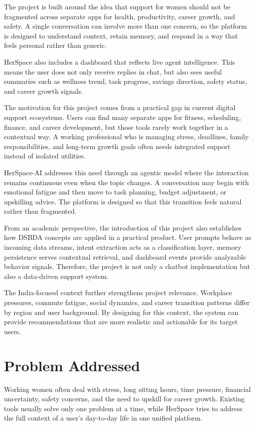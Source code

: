 \documentclass[oneside,a4paper,12pt]{report}
\begin{document}
The project is built around the idea that support for women should not be fragmented across separate apps for health, productivity, career growth, and safety. A single conversation can involve more than one concern, so the platform is designed to understand context, retain memory, and respond in a way that feels personal rather than generic.

HerSpace also includes a dashboard that reflects live agent intelligence. This means the user does not only receive replies in chat, but also sees useful summaries such as wellness trend, task progress, savings direction, safety status, and career growth signals.

The motivation for this project comes from a practical gap in current digital support ecosystems. Users can find many separate apps for fitness, scheduling, finance, and career development, but those tools rarely work together in a contextual way. A working professional who is managing stress, deadlines, family responsibilities, and long-term growth goals often needs integrated support instead of isolated utilities.

HerSpace-AI addresses this need through an agentic model where the interaction remains continuous even when the topic changes. A conversation may begin with emotional fatigue and then move to task planning, budget adjustment, or upskilling advice. The platform is designed so that this transition feels natural rather than fragmented.

From an academic perspective, the introduction of this project also establishes how DSBDA concepts are applied in a practical product. User prompts behave as incoming data streams, intent extraction acts as a classification layer, memory persistence serves contextual retrieval, and dashboard events provide analyzable behavior signals. Therefore, the project is not only a chatbot implementation but also a data-driven support system.

The India-focused context further strengthens project relevance. Workplace pressures, commute fatigue, social dynamics, and career transition patterns differ by region and user background. By designing for this context, the system can provide recommendations that are more realistic and actionable for its target users.

\section{Problem Addressed}
Working women often deal with stress, long sitting hours, time pressure, financial uncertainty, safety concerns, and the need to upskill for career growth. Existing tools usually solve only one problem at a time, while HerSpace tries to address the full context of a user's day-to-day life in one unified platform.
\end{document}
